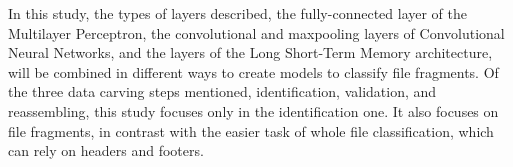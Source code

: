 In this study, the types of layers described, the fully-connected layer of the Multilayer Perceptron, the convolutional and maxpooling layers of Convolutional Neural Networks, and the layers of the Long Short-Term Memory architecture, will be combined in different ways to create models to classify file fragments. Of the three data carving steps mentioned, identification, validation, and reassembling, this study focuses only in the identification one. It also focuses on file fragments, in contrast with the easier task of whole file classification, which can rely on headers and footers.